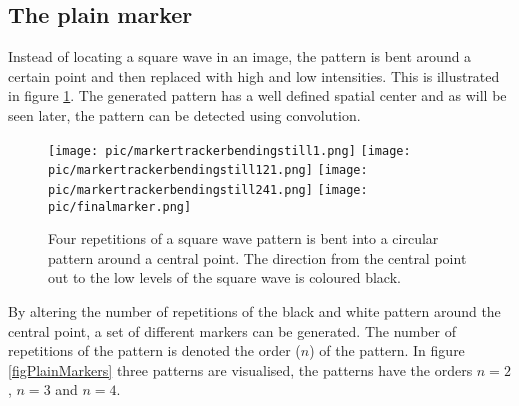 \documentclass{article}
\begin{document}
\subsection{The plain marker}
Instead of locating a square wave in an image, the pattern is bent around a certain point and then replaced with high and low intensities.
This is illustrated in figure \ref{figBendingASquareWaveToACircularPattern}.
The generated pattern has a well defined spatial center and as will be seen later, the pattern can be detected using convolution.
\begin{figure}
\texttt{[image: pic/markertrackerbendingstill1.png]}
\texttt{[image: pic/markertrackerbendingstill121.png]}
\texttt{[image: pic/markertrackerbendingstill241.png]}
\texttt{[image: pic/finalmarker.png]}
\caption{Four repetitions of a square wave pattern is bent into a circular pattern around a central point.
The direction from the central point out to the low levels of the square wave is coloured black.}
\label{figBendingASquareWaveToACircularPattern}
\end{figure}
By altering the number of repetitions of the black and white pattern around the central point,
a set of different markers can be generated.
The number of repetitions of the pattern is denoted the order ($n$) of the pattern.
In figure \ref{figPlainMarkers} three patterns are visualised, the patterns have the orders
$n = 2$, $n = 3$ and $n = 4$.
\end{document}
